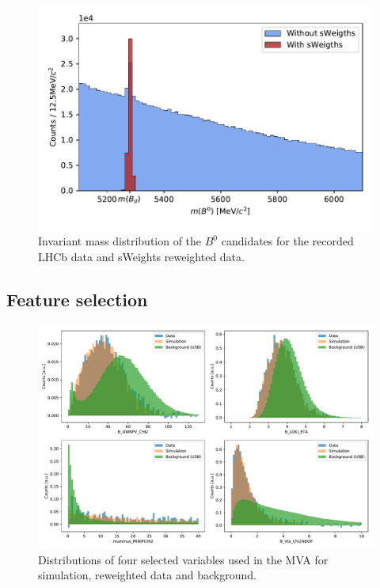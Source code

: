 \begin{figure}
  \centering
  \includegraphics[width = .8\textwidth]{"content/plots/mass_reweighted.pdf"}
  \caption{Invariant mass distribution of the $B^0$ candidates for the recorded LHCb data and sWeights reweighted data.}
  \label{fig:mass_reweighted}
\end{figure}

\subsection{Feature selection}

\begin{figure}
  \centering
  \includegraphics[width = .9\textwidth]{"content/plots/4variables.pdf"}
  \caption{Distributions of four selected variables used in the MVA for simulation, reweighted data and background.}
  \label{fig:4variables}
\end{figure}

